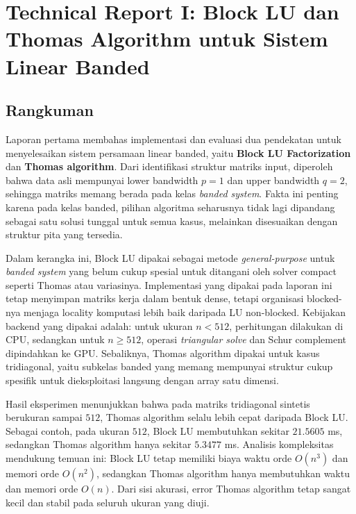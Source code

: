 \documentclass[12pt,a4paper]{article}
\begin{document}
\begin{titlepage}
\end{titlepage}

\clearpage
\tableofcontents
\clearpage

\section*{Technical Report I: Block LU dan Thomas Algorithm untuk Sistem Linear Banded}

\subsection*{Rangkuman}
Laporan pertama membahas implementasi dan evaluasi dua pendekatan untuk menyelesaikan sistem persamaan linear banded, yaitu \textbf{Block LU Factorization} dan \textbf{Thomas algorithm}. Dari identifikasi struktur matriks input, diperoleh bahwa data asli mempunyai lower bandwidth $p=1$ dan upper bandwidth $q=2$, sehingga matriks memang berada pada kelas \emph{banded system}. Fakta ini penting karena pada kelas banded, pilihan algoritma seharusnya tidak lagi dipandang sebagai satu solusi tunggal untuk semua kasus, melainkan disesuaikan dengan struktur pita yang tersedia.

Dalam kerangka ini, Block LU dipakai sebagai metode \emph{general-purpose} untuk \emph{banded system} yang belum cukup spesial untuk ditangani oleh solver compact seperti Thomas atau variasinya. Implementasi yang dipakai pada laporan ini tetap menyimpan matriks kerja dalam bentuk dense, tetapi organisasi blocked-nya menjaga locality komputasi lebih baik daripada LU non-blocked. Kebijakan backend yang dipakai adalah: untuk ukuran $n<512$, perhitungan dilakukan di CPU, sedangkan untuk $n\geq512$, operasi \emph{triangular solve} dan Schur complement dipindahkan ke GPU. Sebaliknya, Thomas algorithm dipakai untuk kasus tridiagonal, yaitu subkelas banded yang memang mempunyai struktur cukup spesifik untuk dieksploitasi langsung dengan array satu dimensi.

Hasil eksperimen menunjukkan bahwa pada matriks tridiagonal sintetis berukuran sampai $512$, Thomas algorithm selalu lebih cepat daripada Block LU. Sebagai contoh, pada ukuran $512$, Block LU membutuhkan sekitar $21.5605$ ms, sedangkan Thomas algorithm hanya sekitar $5.3477$ ms. Analisis kompleksitas mendukung temuan ini: Block LU tetap memiliki biaya waktu orde $O(n^3)$ dan memori orde $O(n^2)$, sedangkan Thomas algorithm hanya membutuhkan waktu dan memori orde $O(n)$. Dari sisi akurasi, error Thomas algorithm tetap sangat kecil dan stabil pada seluruh ukuran yang diuji.
\end{document}
